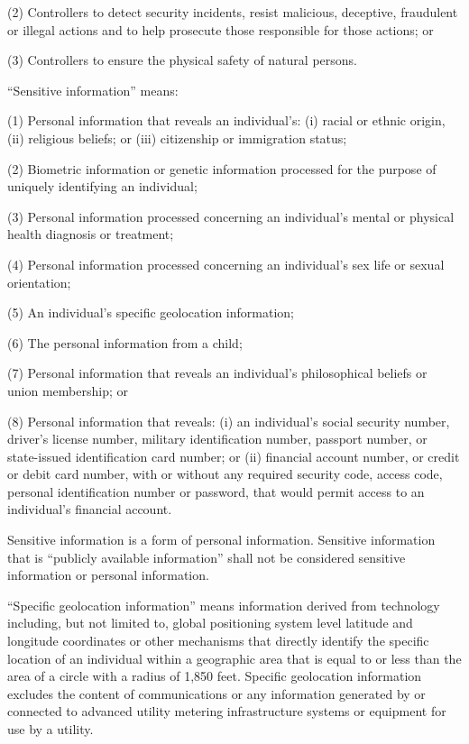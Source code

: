 (2) Controllers to detect security incidents, resist malicious, deceptive, fraudulent or illegal actions and to help prosecute those responsible for those actions; or

(3) Controllers to ensure the physical safety of natural persons. 

“Sensitive information” means:

(1) Personal information that reveals an individual’s: (i) racial or ethnic origin, (ii) religious beliefs; or (iii) citizenship or immigration status;

(2) Biometric information or genetic information processed for the purpose of uniquely identifying an individual;

(3) Personal information processed concerning an individual’s mental or physical health diagnosis or treatment;

(4) Personal information processed concerning an individual’s sex life or sexual orientation;

(5) An individual’s specific geolocation information;

(6) The personal information from a child;

(7) Personal information that reveals an individual’s philosophical beliefs or union membership; or

(8) Personal information that reveals: (i) an individual’s social security number, driver’s license number, military identification number, passport number, or state-issued identification card number; or (ii) financial account number, or credit or debit card number, with or without any required security code, access code, personal identification number or password, that would permit access to an individual’s financial account.

Sensitive information is a form of personal information. Sensitive information that is “publicly available information” shall not be considered sensitive information or personal information.

“Specific geolocation information” means information derived from technology including, but not limited to, global positioning system level latitude and longitude coordinates or other mechanisms that directly identify the specific location of an individual within a geographic area that is equal to or less than the area of a circle with a radius of 1,850 feet. Specific geolocation information excludes the content of communications or any information generated by or connected to advanced utility metering infrastructure systems or equipment for use by a utility.

